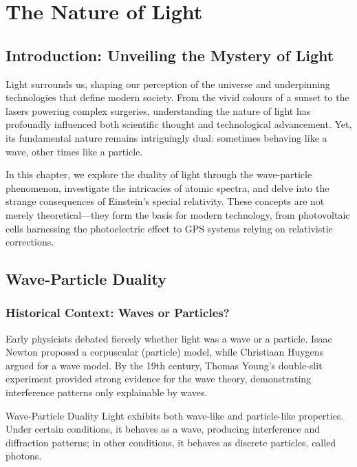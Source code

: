 \chapter{The Nature of Light}

\section{Introduction: Unveiling the Mystery of Light}
\FloatBarrier

Light surrounds us, shaping our perception of the universe and underpinning technologies that define modern society. From the vivid colours of a sunset to the lasers powering complex surgeries, understanding the nature of light has profoundly influenced both scientific thought and technological advancement. Yet, its fundamental nature remains intriguingly dual: sometimes behaving like a wave, other times like a particle.

In this chapter, we explore the duality of light through the wave-particle phenomenon, investigate the intricacies of atomic spectra, and delve into the strange consequences of Einstein's special relativity. These concepts are not merely theoretical—they form the basis for modern technology, from photovoltaic cells harnessing the photoelectric effect to GPS systems relying on relativistic corrections.


\section{Wave-Particle Duality}
\FloatBarrier

\subsection{Historical Context: Waves or Particles?}
\FloatBarrier

Early physicists debated fiercely whether light was a wave or a particle. Isaac Newton proposed a corpuscular (particle) model, while Christiaan Huygens argued for a wave model. By the 19th century, Thomas Young's double-slit experiment provided strong evidence for the wave theory, demonstrating interference patterns only explainable by waves.

\begin{keyconcept}{Wave-Particle Duality}
Light exhibits both wave-like and particle-like properties. Under certain conditions, it behaves as a wave, producing interference and diffraction patterns; in other conditions, it behaves as discrete particles, called photons.
\end{keyconcept}

